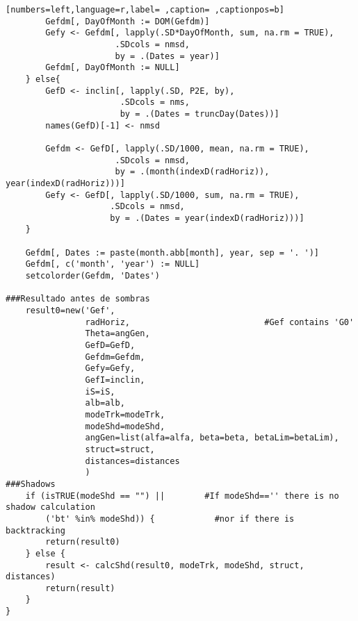 \begin{lstlisting}[numbers=left,language=r,label= ,caption= ,captionpos=b]
        Gefdm[, DayOfMonth := DOM(Gefdm)]
        Gefy <- Gefdm[, lapply(.SD*DayOfMonth, sum, na.rm = TRUE),
                      .SDcols = nmsd,
                      by = .(Dates = year)]
        Gefdm[, DayOfMonth := NULL]
    } else{
        GefD <- inclin[, lapply(.SD, P2E, by),
                       .SDcols = nms,
                       by = .(Dates = truncDay(Dates))]
        names(GefD)[-1] <- nmsd

        Gefdm <- GefD[, lapply(.SD/1000, mean, na.rm = TRUE),
                      .SDcols = nmsd,
                      by = .(month(indexD(radHoriz)), year(indexD(radHoriz)))]
        Gefy <- GefD[, lapply(.SD/1000, sum, na.rm = TRUE),
                     .SDcols = nmsd,
                     by = .(Dates = year(indexD(radHoriz)))]
    }

    Gefdm[, Dates := paste(month.abb[month], year, sep = '. ')]
    Gefdm[, c('month', 'year') := NULL]
    setcolorder(Gefdm, 'Dates')

###Resultado antes de sombras
    result0=new('Gef',
                radHoriz,                           #Gef contains 'G0'
                Theta=angGen,
                GefD=GefD,
                Gefdm=Gefdm,
                Gefy=Gefy,
                GefI=inclin,
                iS=iS,
                alb=alb,
                modeTrk=modeTrk,
                modeShd=modeShd,
                angGen=list(alfa=alfa, beta=beta, betaLim=betaLim),
                struct=struct,
                distances=distances
                )
###Shadows
    if (isTRUE(modeShd == "") ||        #If modeShd=='' there is no shadow calculation
        ('bt' %in% modeShd)) {            #nor if there is backtracking
        return(result0)
    } else {
        result <- calcShd(result0, modeTrk, modeShd, struct, distances)
        return(result)
    }
}
\end{lstlisting}

